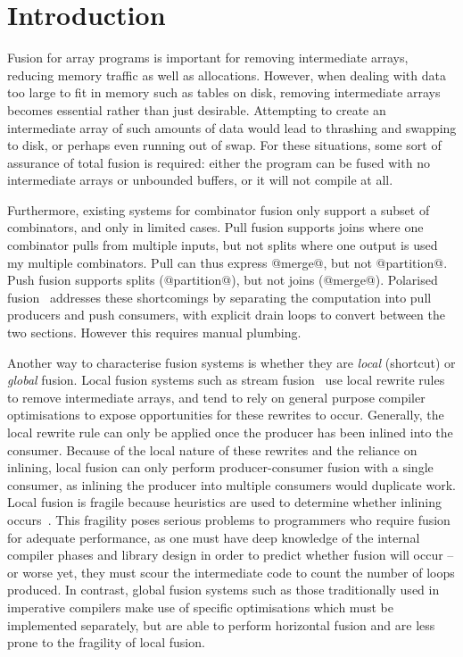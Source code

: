 \section{Introduction}
\label{s:Introduction}

Fusion for array programs is important for removing intermediate arrays, reducing memory traffic as well as allocations.
However, when dealing with data too large to fit in memory such as tables on disk, removing intermediate arrays becomes essential rather than just desirable.
Attempting to create an intermediate array of such amounts of data would lead to thrashing and swapping to disk, or perhaps even running out of swap.
For these situations, some sort of assurance of total fusion is required: either the program can be fused with no intermediate arrays or unbounded buffers, or it will not compile at all.

Furthermore, existing systems for combinator fusion only support a subset of combinators, and only in limited cases.
Pull fusion supports joins where one combinator pulls from multiple inputs, but not splits where one output is used my multiple combinators.
Pull can thus express @merge@, but not @partition@.
Push fusion supports splits (@partition@), but not joins (@merge@).
Polarised fusion~\cite{lippmeier2016polarized} addresses these shortcomings by separating the computation into pull producers and push consumers, with explicit drain loops to convert between the two sections. However this requires manual plumbing.

Another way to characterise fusion systems is whether they are \emph{local} (shortcut) or \emph{global} fusion.
Local fusion systems such as stream fusion~\cite{coutts2007stream} use local rewrite rules to remove intermediate arrays, and tend to rely on general purpose compiler optimisations to expose opportunities for these rewrites to occur.
Generally, the local rewrite rule can only be applied once the producer has been inlined into the consumer.
Because of the local nature of these rewrites and the reliance on inlining, local fusion can only perform producer-consumer fusion with a single consumer, as inlining the producer into multiple consumers would duplicate work.
Local fusion is fragile because heuristics are used to determine whether inlining occurs~\cite{lippmeier2013data}.
This fragility poses serious problems to programmers who require fusion for adequate performance, as one must have deep knowledge of the internal compiler phases and library design in order to predict whether fusion will occur -- or worse yet, they must scour the intermediate code to count the number of loops produced. 
In contrast, global fusion systems such as those traditionally used in imperative compilers make use of specific optimisations which must be implemented separately, but are able to perform horizontal fusion and are less prone to the fragility of local fusion.


